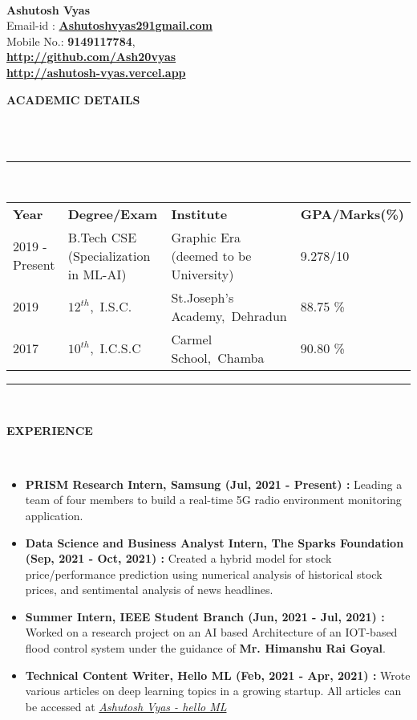 \documentclass[a4paper,10pt]{article}
\newcommand{\lsep}{-0.5cm}
\newcommand{\resheading}[1]{{\small \colorbox{mygrey}{\begin{minipage}{0.975\textwidth}{\textbf{#1 \vphantom{p\^{E}}}}\end{minipage}}}}
\begin{document}
\hspace{0.5cm}\\[-0.2cm]

\textbf{Ashutosh Vyas} \\
\indent Email-id : \textbf{\url{Ashutoshvyas291gmail.com}} \\
\indent Mobile No.: \textbf{9149117784}, \ \\
\indent \textbf{\url{http://github.com/Ash20vyas}}\\
\indent \textbf{\url{http://ashutosh-vyas.vercel.app}}\\

\resheading{\textbf{ACADEMIC DETAILS} }\\[\lsep]
\\
\indent \rule{6.8in}{0.4pt}\\
\indent \begin{tabular}{ l @{\hskip 0.15in} l @{\hskip 0.15in} l @{\hskip 0.15in} l @{\hskip 0.15in} }
\noindent \textbf{Year} & \textbf{Degree/Exam} & \textbf{Institute} & \textbf{GPA/Marks(\%)}\\
2019 - Present & B.Tech CSE (Specialization in ML-AI) & Graphic Era (deemed to be University) & 9.278/10 \\
2019 & $12^{th}$,\ I.S.C. & St.Joseph's Academy,\ Dehradun & 88.75 \% \\
2017 & $10^{th}$,\ I.C.S.C & Carmel School,\ Chamba & 90.80 \%\\

\end{tabular}
\indent \rule{6.8in}{0.4pt}
\\

\resheading{\textbf{EXPERIENCE} }\\[\lsep]
\begin{itemize}
\setlength\itemsep{0.5em}
\item \textbf{PRISM Research Intern, Samsung (Jul, 2021 - Present) : }Leading a team of four members to build a real-time 5G radio environment monitoring application.
\item \textbf{Data Science and Business Analyst Intern, The Sparks Foundation (Sep, 2021 - Oct, 2021) : }Created a hybrid model for stock price/performance prediction using numerical analysis of historical stock prices, and sentimental analysis of news headlines.
\item \textbf{Summer Intern, IEEE Student Branch (Jun, 2021 - Jul, 2021) : }
Worked on a research project on an AI based Architecture of an IOT-based flood control system under the guidance of \textbf{Mr. Himanshu Rai Goyal}.
\item \textbf{Technical Content Writer, Hello ML (Feb, 2021 - Apr, 2021) : }Wrote various articles on deep learning topics in a growing startup.
All articles can be accessed at \href{https://helloml.org/author/ashutosh-vyas/} {\textit{Ashutosh Vyas - hello ML}}
\end{itemize}
\end{document}
